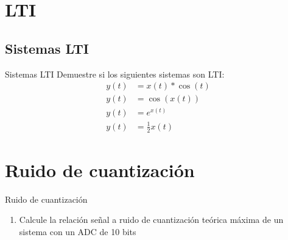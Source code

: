 \subtitle{Trabajo Practico}
\begin{frame}[c]
\maketitle
{}
\end{frame}
 \section{LTI}
 \subsection{Sistemas LTI}
 \begin{frame}{Sistemas LTI}
 Demuestre si los siguientes sistemas son LTI:\\
 \begin{align*}
    y(t) &= x(t)*\cos{(t)} \\
    y(t) &= \cos(x(t)) \\
    y(t) &= e^{x(t)} \\
    y(t) &= \frac{1}{2}x(t)
 \end{align*}
    \vfill
 \end{frame}
 \section{Ruido de cuantización}
 \begin{frame}{Ruido de cuantización}
    \begin{enumerate}
       \item{Calcule la relación señal a ruido de cuantización teórica máxima de un sistema con un ADC de 10 bits}
    \end{enumerate}
 \end{frame}
